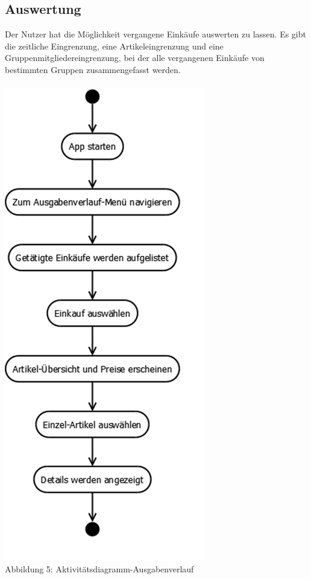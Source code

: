 \documentclass[12pt,a4paper]{article}
\begin{document}
\subsection{Auswertung}
Der Nutzer hat die Möglichkeit vergangene Einkäufe auswerten zu lassen. Es gibt die zeitliche Eingrenzung, eine Artikeleingrenzung und eine Gruppenmitgliedereingrenzung, bei der alle vergangenen Einkäufe von bestimmten Gruppen zusammengefasst werden.
\\
\\
\includegraphics[scale=0.6, origin=l]{Aktivitaets-Diagramm-Ausgabenverlauf.png}
\\
\footnotesize Abbildung 5: Aktivitätsdiagramm-Ausgabenverlauf
\normalsize
\\
\linebreak
\end{document}
